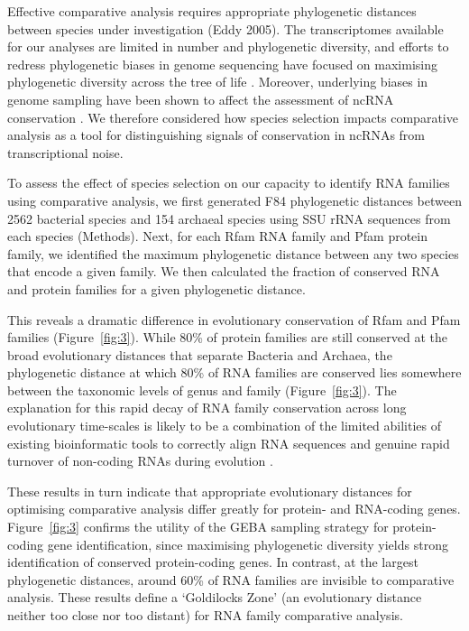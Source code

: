 \documentclass[10pt]{article}
\begin{document}
Effective comparative analysis requires appropriate phylogenetic
distances between species under investigation (Eddy 2005). The
transcriptomes available for our analyses are limited in number and
phylogenetic diversity, and efforts to redress phylogenetic biases in
genome sequencing have focused on maximising phylogenetic diversity
across the tree of life \cite{Wu:2009,Rinke:2013}. Moreover,
underlying biases in genome sampling have been shown to affect the
assessment of ncRNA conservation \cite{Hoeppner:2012}. We therefore
considered how species selection impacts comparative analysis as a
tool for distinguishing signals of conservation in ncRNAs from
transcriptional noise.

To assess the effect of species selection on our capacity to identify
RNA families using comparative analysis, we first generated F84
phylogenetic distances between 2562 bacterial species and 154 archaeal
species using SSU rRNA sequences from each species (Methods). Next,
for each Rfam RNA family and Pfam protein family, we identified the
maximum phylogenetic distance between any two species that encode a
given family. We then calculated the fraction of conserved RNA and
protein families for a given phylogenetic distance.

This reveals a dramatic difference in evolutionary conservation of
Rfam and Pfam families (Figure~\ref{fig:3}). While 80\% of protein families are
still conserved at the broad evolutionary distances that separate
Bacteria and Archaea, the phylogenetic distance at which 80\% of RNA
families are conserved lies somewhere between the taxonomic levels of
genus and family (Figure~\ref{fig:3}). The explanation for this rapid decay of RNA
family conservation across long evolutionary time-scales is likely to
be a combination of the limited abilities of existing bioinformatic
tools to correctly align RNA sequences \cite{Gardner:2005} and genuine
rapid turnover of non-coding RNAs during evolution
\cite{Hoeppner:2012}.

These results in turn indicate that appropriate evolutionary distances
for optimising comparative analysis differ greatly for protein- and
RNA-coding genes. Figure~\ref{fig:3} confirms the utility of the GEBA sampling
strategy \cite{Wu:2009,Rinke:2013} for protein-coding gene
identification, since maximising phylogenetic diversity yields strong
identification of conserved protein-coding genes. In contrast, at the
largest phylogenetic distances, around 60\% of RNA families are
invisible to comparative analysis. These results define a ‘Goldilocks
Zone’ (an evolutionary distance neither too close nor too distant) for
RNA family comparative analysis.
\end{document}
